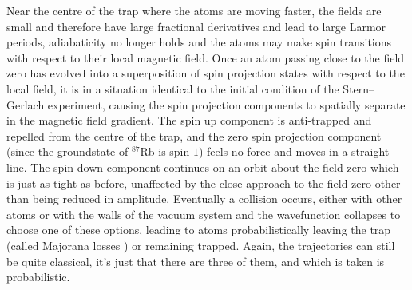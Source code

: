 Near the centre of the trap where the atoms are moving faster, the fields are small and therefore have large fractional derivatives and lead to large Larmor periods, adiabaticity no longer holds and the atoms may make spin transitions with respect to their local magnetic field. Once an atom passing close to the field zero has evolved into a superposition of spin projection states with respect to the local field, it is in a situation identical to the initial condition of the Stern--Gerlach experiment, causing the spin projection components to spatially separate in the magnetic field gradient. The spin up component is anti-trapped and repelled from the centre of the trap, and the zero spin projection component (since the groundstate of $^{87}$Rb is spin-$1$) feels no force and moves in a straight line. The spin down component continues on an orbit about the field zero which is just as tight as before, unaffected by the close approach to the field zero other than being reduced in amplitude. Eventually a collision occurs, either with other atoms or with the walls of the vacuum system and the wavefunction collapses to choose one of these options, leading to atoms probabilistically leaving the trap (called Majorana losses \cite{Majorana1932, PhysRevLett.74.3352}) or remaining trapped. Again, the trajectories can still be quite classical, it's just that there are three of them, and which is taken is probabilistic.

